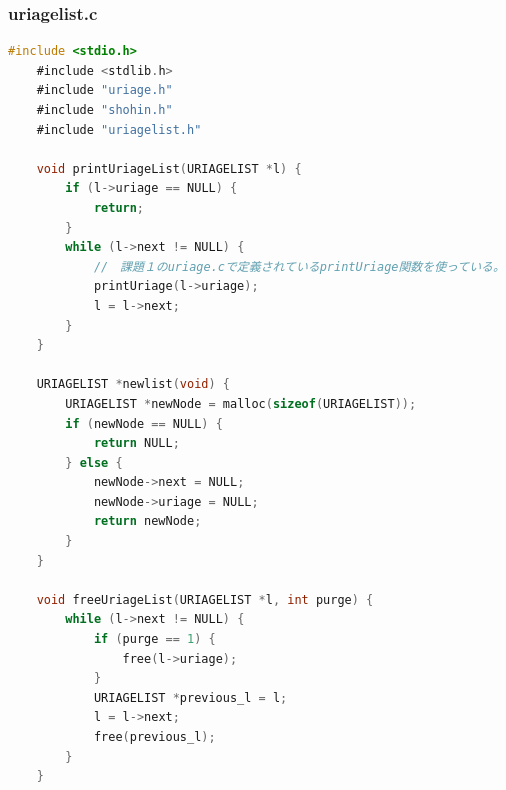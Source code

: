 \documentclass[10pt]{article}
\begin{document}
\subsubsection{uriagelist.c}
\begin{lstlisting}[language=C]
    #include <stdio.h>
    #include <stdlib.h>
    #include "uriage.h"
    #include "shohin.h"
    #include "uriagelist.h"
    
    void printUriageList(URIAGELIST *l) {
        if (l->uriage == NULL) {
            return;
        }
        while (l->next != NULL) {
            //　課題１のuriage.cで定義されているprintUriage関数を使っている。
            printUriage(l->uriage);
            l = l->next;
        }
    }
    
    URIAGELIST *newlist(void) {
        URIAGELIST *newNode = malloc(sizeof(URIAGELIST));
        if (newNode == NULL) {
            return NULL;
        } else {
            newNode->next = NULL;
            newNode->uriage = NULL;
            return newNode;
        }
    }
    
    void freeUriageList(URIAGELIST *l, int purge) {
        while (l->next != NULL) {
            if (purge == 1) {
                free(l->uriage);
            }
            URIAGELIST *previous_l = l;
            l = l->next;
            free(previous_l);
        }
    }
\end{lstlisting}
\end{document}
